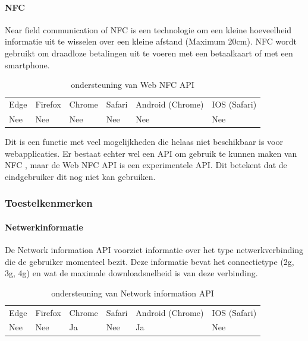 \paragraph{NFC}

Near field communication of NFC is een technologie om een kleine hoeveelheid informatie uit te wisselen over een kleine afstand (Maximum 20cm). NFC wordt gebruikt om draadloze betalingen uit te voeren met een betaalkaart of met een smartphone. 
\autocite{Paus2007}

\begin{table}[H]
	\centering
	\begin{tabular}{llllll}
		Edge & Firefox & Chrome & Safari & Android (Chrome) & IOS (Safari) \\
		Nee   & Nee      &  Nee     & Nee     & Nee               & Nee          
	\end{tabular}	
	\caption{ondersteuning van Web NFC API }
	\label{ondersteuning van Web NFC API}
\end{table}

Dit is een functie met veel mogelijkheden die helaas niet beschikbaar is voor webapplicaties.
Er bestaat echter wel een API om gebruik te kunnen maken van NFC \autocite{RohdeChristiansen2020}, maar de Web NFC API is een experimentele API. Dit betekent dat de eindgebruiker dit nog niet kan gebruiken.



\subsubsection{Toestelkenmerken}


\paragraph{Netwerkinformatie}

De Network information API \autocite{Lamouri2020} voorziet informatie over het type netwerkverbinding die de gebruiker momenteel bezit. Deze informatie bevat het connectietype (2g, 3g, 4g) en wat de maximale downloadsnelheid is van deze verbinding.

\begin{table}[H]
	\centering
	\begin{tabular}{llllll}
		Edge & Firefox & Chrome & Safari & Android (Chrome) & IOS (Safari) \\
		Nee   & Nee      &  Ja     & Nee     & Ja               & Nee          
	\end{tabular}	
	\caption{ondersteuning van Network information API }
	\label{ondersteuning van Network information API}
\end{table}

